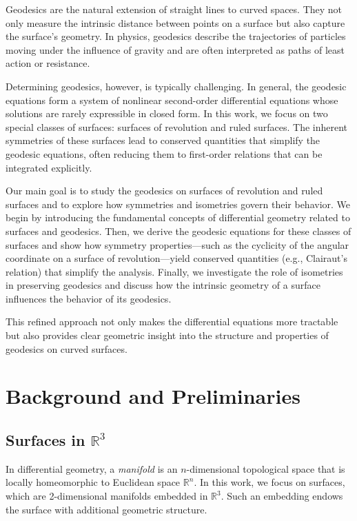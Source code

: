 \documentclass[12pt]{article}
\newcommand{\R}{\mathbb{R}}
\begin{document}
Geodesics are the natural extension of straight lines to curved spaces. 
They not only measure the intrinsic distance between points on a surface but also capture the surface’s geometry. 
In physics, geodesics describe the trajectories of particles moving under the influence of gravity and are often interpreted as paths of least action or resistance.

Determining geodesics, however, is typically challenging. 
In general, the geodesic equations form a system of nonlinear second-order differential equations whose solutions are rarely expressible in closed form. 
In this work, we focus on two special classes of surfaces: surfaces of revolution and ruled surfaces. 
The inherent symmetries of these surfaces lead to conserved quantities that simplify the geodesic equations, often reducing them to first-order relations that can be integrated explicitly.

Our main goal is to study the geodesics on surfaces of revolution and ruled surfaces and to explore how symmetries and isometries govern their behavior. 
We begin by introducing the fundamental concepts of differential geometry related to surfaces and geodesics. 
Then, we derive the geodesic equations for these classes of surfaces and show how symmetry properties—such as the cyclicity of the angular coordinate on a surface of revolution—yield conserved quantities (e.g., Clairaut’s relation) that simplify the analysis. 
Finally, we investigate the role of isometries in preserving geodesics and discuss how the intrinsic geometry of a surface influences the behavior of its geodesics.

This refined approach not only makes the differential equations more tractable but also provides clear geometric insight into the structure and properties of geodesics on curved surfaces.

\section{Background and Preliminaries}


\subsection{Surfaces in \texorpdfstring{$\R^3$}{R3}}

In differential geometry, a \emph{manifold} is an $n$-dimensional topological space that is locally homeomorphic to Euclidean space $\R^n$. In this work, we focus on surfaces, which are 2-dimensional manifolds embedded in $\R^3$. Such an embedding endows the surface with additional geometric structure.
\end{document}
